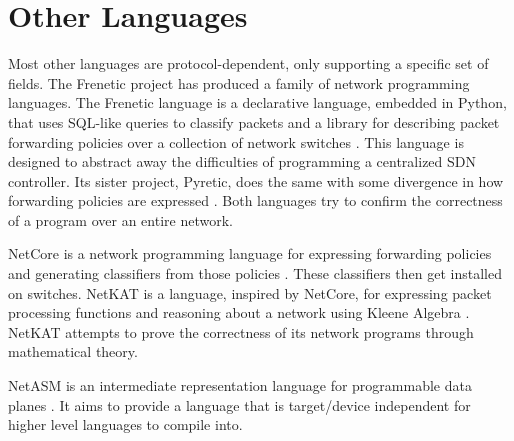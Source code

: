 \section{Other Languages} \label{rel:frenetic}

Most other languages are protocol-dependent, only supporting a specific set of
fields. The Frenetic project has produced a family of network programming
languages. The Frenetic language is a declarative language, embedded in Python,
that uses SQL-like queries to classify packets and a library for describing
packet forwarding policies over a collection of network switches
\cite{foster2011frenetic, foster2013frenetic}. This language is designed to
abstract away the difficulties of programming a centralized SDN controller. Its
sister project, Pyretic, does the same with some divergence in how forwarding
policies are expressed \cite{modularpyretic}. Both languages try to confirm the correctness of a program over an entire network.

NetCore is a network programming language for expressing forwarding policies and
generating classifiers from those policies \cite{monsanto2012netcore}. These
classifiers then get installed on switches. NetKAT is a language, inspired by
NetCore, for expressing packet processing functions and reasoning about a
network using Kleene Algebra \cite{kozen2014netkat, anderson2014netkat}. NetKAT
attempts to prove the correctness of its network programs through mathematical theory.

NetASM is an intermediate representation language for programmable data planes
\cite{shahbaz2015netasm}. It aims to provide a language that is target/device
independent for higher level languages to compile into.
